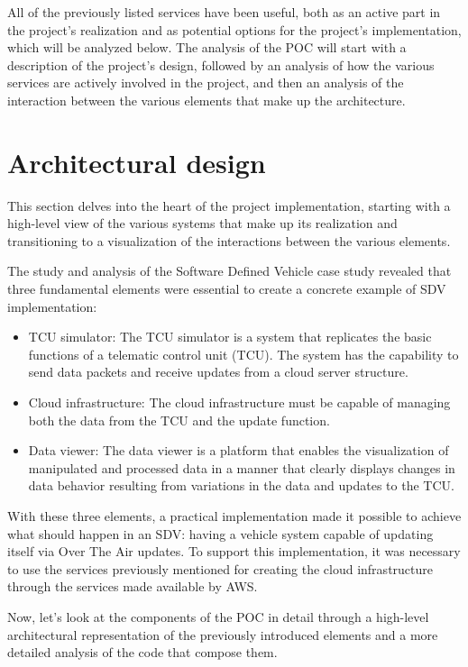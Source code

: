 All of the previously listed services have been useful, both as an active part in the project's realization and as potential options for the project's implementation, which will be analyzed below. The analysis of the POC will start with a description of the project's design, followed by an analysis of how the various services are actively involved in the project, and then an analysis of the interaction between the various elements that make up the architecture.

\section{Architectural design}
This section delves into the heart of the project implementation, starting with a high-level view of the various systems that make up its realization and transitioning to a visualization of the interactions between the various elements.

The study and analysis of the Software Defined Vehicle case study revealed that three fundamental elements were essential to create a concrete example of SDV implementation:
\begin{itemize}
    \item TCU simulator: The TCU simulator is a system that replicates the basic functions of a telematic control unit (TCU). The system has the capability to send data packets and receive updates from a cloud server structure.
    \item Cloud infrastructure: The cloud infrastructure must be capable of managing both the data from the TCU and the update function.
    \item Data viewer:  The data viewer is a platform that enables the visualization of manipulated and processed data in a manner that clearly displays changes in data behavior resulting from variations in the data and updates to the TCU.
\end{itemize}

With these three elements, a practical implementation made it possible to achieve what should happen in an SDV: having a vehicle system capable of updating itself via Over The Air updates. To support this implementation, it was necessary to use the services previously mentioned for creating the cloud infrastructure through the services made available by AWS.

Now, let's look at the components of the POC in detail through a high-level architectural representation of the previously introduced elements and a more detailed analysis of the code that compose them.

